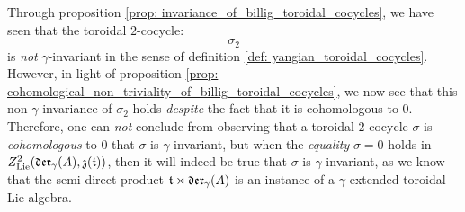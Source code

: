         \begin{remark}
            Through proposition \ref{prop: invariance_of_billig_toroidal_cocycles}, we have seen that the toroidal $2$-cocycle:
                $$\sigma_2$$
            is \textit{not} $\gamma$-invariant in the sense of definition \ref{def: yangian_toroidal_cocycles}. However, in light of proposition \ref{prop: cohomological_non_triviality_of_billig_toroidal_cocycles}, we now see that this non-$\gamma$-invariance of $\sigma_2$ holds \textit{despite} the fact that it is cohomologous to $0$. Therefore, one can \textit{not} conclude from observing that a toroidal $2$-cocycle $\sigma$ is \textit{cohomologous} to $0$ that $\sigma$ is $\gamma$-invariant, but when the \textit{equality} $\sigma = 0$ holds in $Z^2_{\mathrm{Lie}}(\mathfrak{der}_{\gamma}(A), \mathfrak{z}(\mathfrak{t}))$, then it will indeed be true that $\sigma$ is $\gamma$-invariant, as we know that the semi-direct product $\mathfrak{t} \rtimes \mathfrak{der}_{\gamma}(A)$ is an instance of a $\gamma$-extended toroidal Lie algebra.
        \end{remark}
